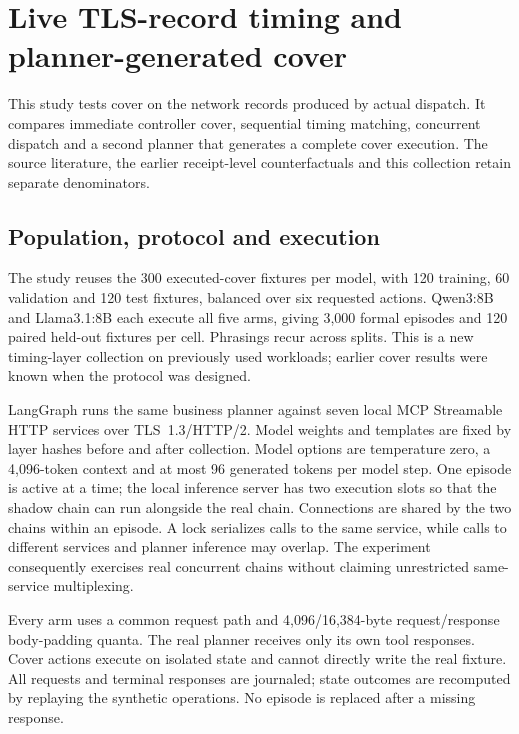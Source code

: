 \section{Live TLS-record timing and planner-generated cover}\label{supp:live-timing}
This study tests cover on the network records produced by actual dispatch. It compares immediate controller cover, sequential timing matching, concurrent dispatch and a second planner that generates a complete cover execution. The source literature, the earlier receipt-level counterfactuals and this collection retain separate denominators.

\subsection{Population, protocol and execution}
The study reuses the 300 executed-cover fixtures per model, with 120 training, 60 validation and 120 test fixtures, balanced over six requested actions. Qwen3:8B and Llama3.1:8B each execute all five arms, giving 3,000 formal episodes and 120 paired held-out fixtures per cell. Phrasings recur across splits. This is a new timing-layer collection on previously used workloads; earlier cover results were known when the protocol was designed.

LangGraph runs the same business planner against seven local MCP Streamable HTTP services over TLS~1.3/HTTP/2. Model weights and templates are fixed by layer hashes before and after collection. Model options are temperature zero, a 4,096-token context and at most 96 generated tokens per model step. One episode is active at a time; the local inference server has two execution slots so that the shadow chain can run alongside the real chain. Connections are shared by the two chains within an episode. A lock serializes calls to the same service, while calls to different services and planner inference may overlap. The experiment consequently exercises real concurrent chains without claiming unrestricted same-service multiplexing.

Every arm uses a common  request path and 4,096/16,384-byte request/response body-padding quanta. The real planner receives only its own tool responses. Cover actions execute on isolated state and cannot directly write the real fixture. All requests and terminal responses are journaled; state outcomes are recomputed by replaying the synthetic operations. No episode is replaced after a missing response.

